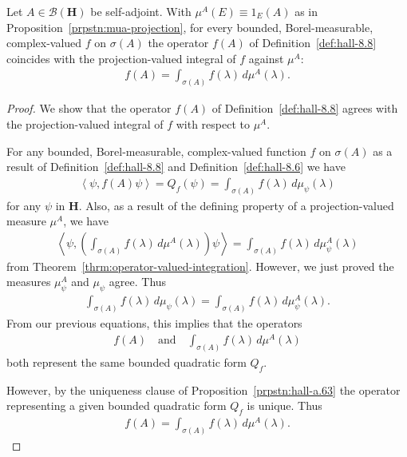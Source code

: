 \begin{proposition}
    \label{prpstn:mua-bounded-calculus-agrees}
    \leanok
    Let $A \in \mathcal{B}(\mathbf{H})$ be self-adjoint. With $\mu^A(E) \equiv 1_E(A)$ as in Proposition~\ref{prpstn:mua-projection}, for every bounded, Borel-measurable, complex-valued $f$ on $\sigma(A)$ the operator $f(A)$ of Definition~\ref{def:hall-8.8} coincides with the projection-valued integral of $f$ against $\mu^A$:
    \begin{align}
        f(A) = \int_{\sigma(A)} f(\lambda) \, d\mu^A(\lambda).
    \end{align}
\end{proposition}
\begin{proof}
    \leanok
We show that the operator $f(A)$ of Definition~\ref{def:hall-8.8} agrees with the projection-valued integral of $f$ with respect to $\mu^A$.

For any bounded, Borel-measurable, complex-valued function $f$ on $\sigma(A)$ as a result of Definition~\ref{def:hall-8.8} and Definition~\ref{def:hall-8.6} we have
\begin{align}
    \left< \psi, f(A) \psi \right> = Q_f(\psi) = \int_{\sigma(A)} f(\lambda) \, d\mu_\psi(\lambda) 
\end{align}
for any $\psi$ in $\mathbf{H}$. Also, as a result of the defining property of a projection-valued measure $\mu^A$, we have
\begin{align}
    \left< \psi, \left( \int_{\sigma(A)} f(\lambda) \, d\mu^A(\lambda) \right) \psi \right> = \int_{\sigma(A)} f(\lambda) \, d\mu^A_\psi(\lambda)
\end{align}
from Theorem~\ref{thrm:operator-valued-integration}. However, we just proved the measures $\mu^A_\psi$ and $\mu_\psi$ agree. Thus
\begin{align}
    \int_{\sigma(A)} f(\lambda) \, d\mu_\psi(\lambda) = \int_{\sigma(A)} f(\lambda) \, d\mu^A_\psi(\lambda).
\end{align}
From our previous equations, this implies that the operators
\begin{align}
    f(A) \quad \text{and} \quad \int_{\sigma(A)} f(\lambda) \, d\mu^A(\lambda)
\end{align}
both represent the same bounded quadratic form $Q_f$.

However, by the uniqueness clause of Proposition~\ref{prpstn:hall-a.63} the operator representing a given bounded quadratic form $Q_f$ is unique. Thus
\begin{align}
    f(A) = \int_{\sigma(A)} f(\lambda) \, d\mu^A(\lambda).
\end{align}
\end{proof}


